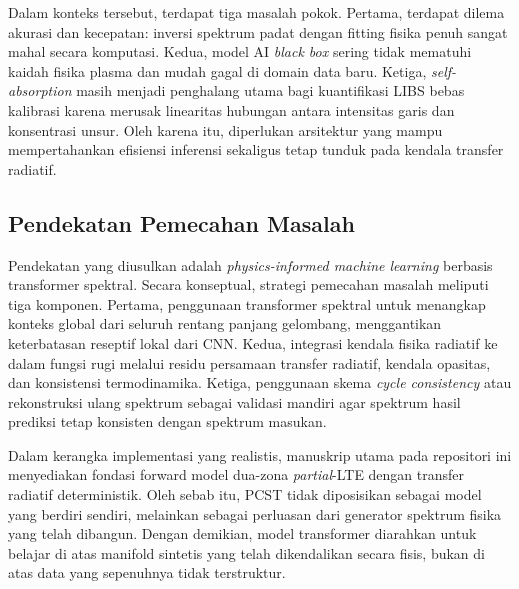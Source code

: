 Dalam konteks tersebut, terdapat tiga masalah pokok. Pertama, terdapat dilema akurasi dan kecepatan: inversi spektrum padat dengan fitting fisika penuh sangat mahal secara komputasi. Kedua, model AI \textit{black box} sering tidak mematuhi kaidah fisika plasma dan mudah gagal di domain data baru. Ketiga, \textit{self-absorption} masih menjadi penghalang utama bagi kuantifikasi LIBS bebas kalibrasi karena merusak linearitas hubungan antara intensitas garis dan konsentrasi unsur. Oleh karena itu, diperlukan arsitektur yang mampu mempertahankan efisiensi inferensi sekaligus tetap tunduk pada kendala transfer radiatif.

\subsection{Pendekatan Pemecahan Masalah}
Pendekatan yang diusulkan adalah \textit{physics-informed machine learning} berbasis transformer spektral. Secara konseptual, strategi pemecahan masalah meliputi tiga komponen. Pertama, penggunaan transformer spektral untuk menangkap konteks global dari seluruh rentang panjang gelombang, menggantikan keterbatasan reseptif lokal dari CNN. Kedua, integrasi kendala fisika radiatif ke dalam fungsi rugi melalui residu persamaan transfer radiatif, kendala opasitas, dan konsistensi termodinamika. Ketiga, penggunaan skema \textit{cycle consistency} atau rekonstruksi ulang spektrum sebagai validasi mandiri agar spektrum hasil prediksi tetap konsisten dengan spektrum masukan.

Dalam kerangka implementasi yang realistis, manuskrip utama pada repositori ini menyediakan fondasi forward model dua-zona \textit{partial}-LTE dengan transfer radiatif deterministik. Oleh sebab itu, PCST tidak diposisikan sebagai model yang berdiri sendiri, melainkan sebagai perluasan dari generator spektrum fisika yang telah dibangun. Dengan demikian, model transformer diarahkan untuk belajar di atas manifold sintetis yang telah dikendalikan secara fisis, bukan di atas data yang sepenuhnya tidak terstruktur.

